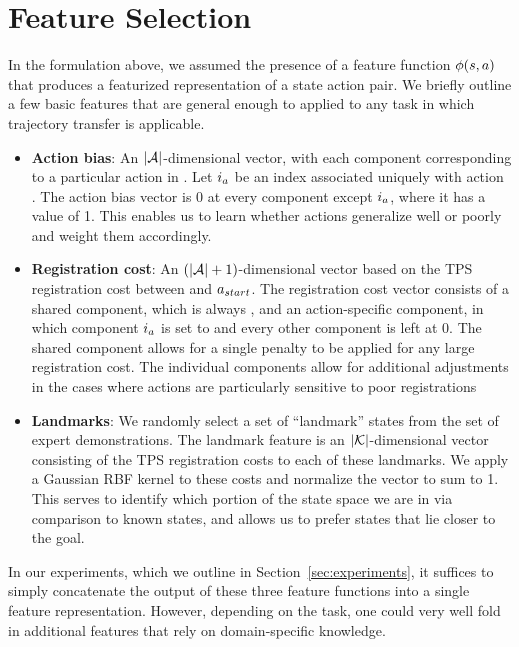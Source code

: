 \section{Feature Selection}
\label{sec:features}
%

In the formulation above, we assumed the presence of a feature function
$\phi({s}, a)$ that produces a featurized representation of
a state action pair.  We briefly outline a few basic features that are general
enough to applied to any task in which trajectory transfer is
applicable. 

\begin{itemize}
  \item \textbf{Action bias}: An $|\mathcal{A}{}|$-dimensional vector, with each
    component corresponding to a particular action in \actionset{}. Let
    $i{}_{a{}}$ be an index associated uniquely with action
    \actionvar{}. The action bias vector is 0 at every component except
    $i{}_{a{}}$, where it has a value of 1. This enables us to
    learn whether actions generalize well or poorly and weight them accordingly.
  \item \textbf{Registration cost}: An $(|\mathcal{A}{}|+1)$-dimensional vector
    based on the TPS registration cost \regcost{} between \statevar{} and
    $a{}_{start}$. The registration cost vector consists of a shared
    component, which is always \regcost{}, and an action-specific component, in
    which component $i{}_{a{}}$ is set to \regcost{} and every
    other component is left at 0. The shared component allows for a single
    penalty to be applied for any large registration cost. The individual
    components allow for additional adjustments in the cases where actions are
    particularly sensitive to poor registrations
  \item \textbf{Landmarks}: We randomly select a set of ``landmark'' states
    \landmarkset{} from the set of expert demonstrations. The landmark feature
    is an $|\mathcal{K}{}|$-dimensional vector consisting of the TPS
    registration costs to each of these landmarks. We apply a Gaussian RBF
    kernel to these costs and normalize the vector to sum to 1. This serves to
    identify which portion of the state space we are in via comparison to known
    states, and allows us to prefer states that lie closer to the goal.
\end{itemize}

In our experiments, which we outline in Section~\ref{sec:experiments}, it
suffices to simply concatenate the output of these three feature functions into
a single feature representation. However, depending on the task, one could
very well fold in additional features that rely on domain-specific knowledge.
